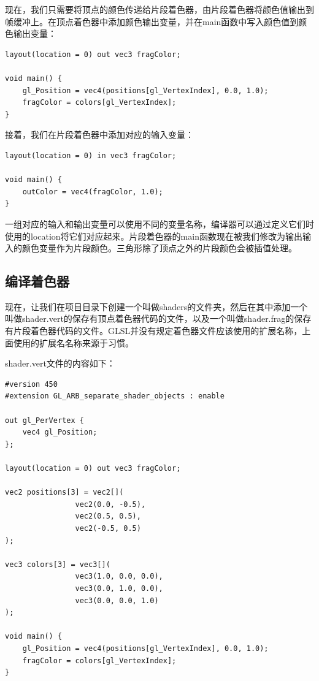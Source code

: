 \documentclass{ctexart}
\begin{document}
现在，我们只需要将顶点的颜色传递给片段着色器，由片段着色器将颜色值输出到帧缓冲上。在顶点着色器中添加颜色输出变量，并在main函数中写入颜色值到颜色输出变量：

\begin{lstlisting}[language={[ANSI]C}]
layout(location = 0) out vec3 fragColor;

void main() {
	gl_Position = vec4(positions[gl_VertexIndex], 0.0, 1.0);
	fragColor = colors[gl_VertexIndex];
}
\end{lstlisting}

接着，我们在片段着色器中添加对应的输入变量：

\begin{lstlisting}[language={[ANSI]C}]
layout(location = 0) in vec3 fragColor;

void main() {
	outColor = vec4(fragColor, 1.0);
}
\end{lstlisting}

一组对应的输入和输出变量可以使用不同的变量名称，编译器可以通过定义它们时使用的location将它们对应起来。片段着色器的main函数现在被我们修改为输出输入的颜色变量作为片段颜色。三角形除了顶点之外的片段颜色会被插值处理。

\subsection{编译着色器}

现在，让我们在项目目录下创建一个叫做shaders的文件夹，然后在其中添加一个叫做shader.vert的保存有顶点着色器代码的文件，以及一个叫做shader.frag的保存有片段着色器代码的文件。GLSL并没有规定着色器文件应该使用的扩展名称，上面使用的扩展名名称来源于习惯。

shader.vert文件的内容如下：

\begin{lstlisting}[language={[ANSI]C}]
#version 450
#extension GL_ARB_separate_shader_objects : enable

out gl_PerVertex {
	vec4 gl_Position;
};

layout(location = 0) out vec3 fragColor;

vec2 positions[3] = vec2[](
				vec2(0.0, -0.5),
				vec2(0.5, 0.5),
				vec2(-0.5, 0.5)
);

vec3 colors[3] = vec3[](
				vec3(1.0, 0.0, 0.0),
				vec3(0.0, 1.0, 0.0),
				vec3(0.0, 0.0, 1.0)
);

void main() {
	gl_Position = vec4(positions[gl_VertexIndex], 0.0, 1.0);
	fragColor = colors[gl_VertexIndex];
}
\end{lstlisting}
\end{document}
